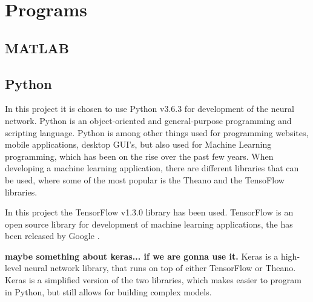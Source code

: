 \section{Programs}


\subsection{MATLAB}


\subsection{Python}
In this project it is chosen to use Python v3.6.3 for development of the neural network.  
Python is an object-oriented and general-purpose programming and scripting language. Python is among other things used for programming websites, mobile applications, desktop GUI's, but also used for Machine Learning programming, which has been on the rise over the past few years.    
When developing a machine learning application, there are different libraries that can be used, where some of the most popular is the Theano and the TensoFlow libraries.\citep{Swamynathan2017}

In this project the TensorFlow v1.3.0 library has been used. 
TensorFlow is an open source library for development of machine learning applications, the has been released by Google \citep{Swamynathan2017}. 


\textbf{maybe something about keras... if we are gonna use it.  }
Keras is a high-level neural network library, that runs on top of either TensorFlow or Theano. Keras is a simplified version of the two libraries, which makes easier to program in Python, but still allows for building complex models.\citep{Swamynathan2017}  